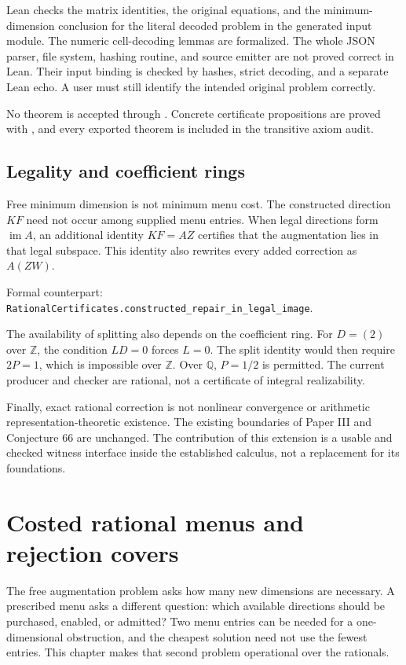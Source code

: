 \documentclass[11pt,letterpaper,oneside,openany]{book}
\theoremstyle{quiet}
\newcommand{\Q}{\mathbb{Q}}
\newcommand{\Z}{\mathbb{Z}}
\DeclareMathOperator{\im}{im}
\newcommand{\code}[1]{\texttt{\detokenize{#1}}}
\newcommand{\formal}[1]{\par\nobreak\begingroup\footnotesize\color{Slate}\sffamily Formal counterpart: \normalfont\nolinkurl{#1}.\par\endgroup}
\begin{document}
\begin{scopebox}[title=The precise trust boundary]
Lean checks the matrix identities, the original equations, and the minimum-dimension conclusion for the literal decoded problem in the generated input module. The numeric cell-decoding lemmas are formalized. The whole JSON parser, file system, hashing routine, and source emitter are not proved correct in Lean. Their input binding is checked by hashes, strict decoding, and a separate Lean echo. A user must still identify the intended original problem correctly.

No theorem is accepted through \code{native_decide}. Concrete certificate propositions are proved with \code{decide +kernel}, and every exported theorem is included in the transitive axiom audit.
\end{scopebox}

\section{Legality and coefficient rings}
Free minimum dimension is not minimum menu cost. The constructed direction $KF$ need not occur among supplied menu entries. When legal directions form $\im A$, an additional identity $KF=AZ$ certifies that the augmentation lies in that legal subspace. This identity also rewrites every added correction as $A(ZW)$.
\formal{RationalCertificates.constructed_repair_in_legal_image}

The availability of splitting also depends on the coefficient ring. For $D=(2)$ over $\Z$, the condition $LD=0$ forces $L=0$. The split identity would then require $2P=1$, which is impossible over $\Z$. Over $\Q$, $P=1/2$ is permitted. The current producer and checker are rational, not a certificate of integral realizability.

Finally, exact rational correction is not nonlinear convergence or arithmetic representation-theoretic existence. The existing boundaries of Paper III and Conjecture 66 are unchanged. The contribution of this extension is a usable and checked witness interface inside the established calculus, not a replacement for its foundations.

\chapter{Costed rational menus and rejection covers}
\label{ch:menu-covers}

The free augmentation problem asks how many new dimensions are necessary. A prescribed menu asks a different question: which available directions should be purchased, enabled, or admitted? Two menu entries can be needed for a one-dimensional obstruction, and the cheapest solution need not use the fewest entries. This chapter makes that second problem operational over the rationals.
\end{document}
